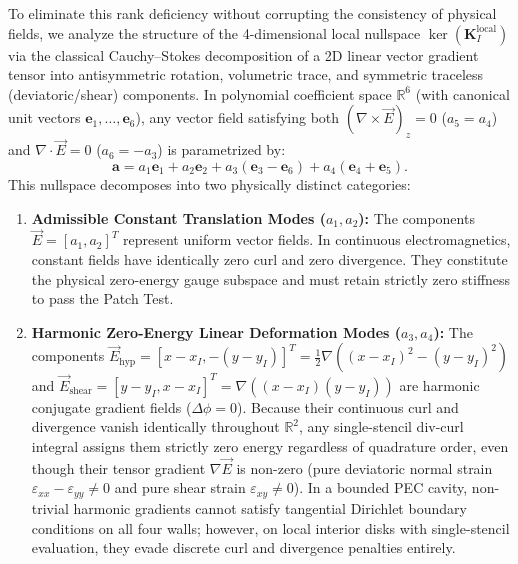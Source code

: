 \documentclass[VANCOUVER,Times1COL]{WileyNJD-v5}
\begin{document}
To eliminate this rank deficiency without corrupting the consistency of physical fields, we analyze the structure of the 4-dimensional local nullspace $\ker(\mathbf{K}_I^{\mathrm{local}})$ via the classical Cauchy--Stokes decomposition of a 2D linear vector gradient tensor into antisymmetric rotation, volumetric trace, and symmetric traceless (deviatoric/shear) components. In polynomial coefficient space $\mathbb{R}^6$ (with canonical unit vectors $\mathbf{e}_1, \dots, \mathbf{e}_6$), any vector field satisfying both $(\nabla \times \vec{E})_z = 0$ ($a_5 = a_4$) and $\nabla \cdot \vec{E} = 0$ ($a_6 = -a_3$) is parametrized by:
\begin{equation}
    \mathbf{a} = a_1 \mathbf{e}_1 + a_2 \mathbf{e}_2 + a_3 (\mathbf{e}_3 - \mathbf{e}_6) + a_4 (\mathbf{e}_4 + \mathbf{e}_5).
\end{equation}
This nullspace decomposes into two physically distinct categories:
\begin{enumerate}
    \item \textbf{Admissible Constant Translation Modes ($a_1, a_2$):} The components $\vec{E} = [a_1, a_2]^T$ represent uniform vector fields. In continuous electromagnetics, constant fields have identically zero curl and zero divergence. They constitute the physical zero-energy gauge subspace and must retain strictly zero stiffness to pass the Patch Test.
    \item \textbf{Harmonic Zero-Energy Linear Deformation Modes ($a_3, a_4$):} The components $\vec{E}_{\mathrm{hyp}} = [x - x_I, -(y - y_I)]^T = \frac{1}{2}\nabla((x-x_I)^2 - (y-y_I)^2)$ and $\vec{E}_{\mathrm{shear}} = [y - y_I, x - x_I]^T = \nabla((x-x_I)(y-y_I))$ are harmonic conjugate gradient fields ($\Delta\phi = 0$). Because their continuous curl and divergence vanish identically throughout $\mathbb{R}^2$, any single-stencil div-curl integral assigns them strictly zero energy regardless of quadrature order, even though their tensor gradient $\nabla\vec{E}$ is non-zero (pure deviatoric normal strain $\varepsilon_{xx} - \varepsilon_{yy} \ne 0$ and pure shear strain $\varepsilon_{xy} \ne 0$). In a bounded PEC cavity, non-trivial harmonic gradients cannot satisfy tangential Dirichlet boundary conditions on all four walls; however, on local interior disks with single-stencil evaluation, they evade discrete curl and divergence penalties entirely.
\end{enumerate}
\end{document}
